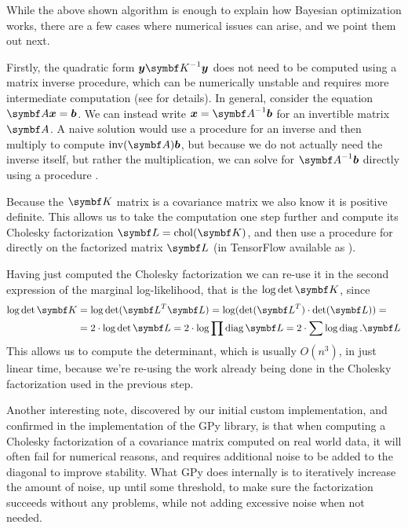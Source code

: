 While the above shown algorithm is enough to explain how Bayesian optimization works, there are a few cases where numerical issues can arise, and we point them out next.

Firstly, the quadratic form $\vy \mK^{-1} \vy$ does not need to be computed using a matrix inverse procedure, which can be numerically unstable and requires more intermediate computation (see \cite{cholesky-inverse-krishnamoorthy2013matrix} for details). In general, consider the equation $\mA \vx = \vb$. We can instead write $\vx = \mA^{-1} \vb$ for an invertible matrix $\mA$. A naive solution would use a procedure for an inverse and then multiply to compute $\inv(\mA) \vb$, but because we do not actually need the inverse itself, but rather the multiplication, we can solve for $\mA^{-1} \vb$ directly using a  procedure \citep{numpy}.

Because the $\mK$ matrix is a covariance matrix we also know it is positive definite. This allows us to take the computation one step further and compute its Cholesky factorization $\mL = \chol(\mK)$, and then use a procedure for  directly on the factorized matrix $\mL$ (in TensorFlow available as ).

Having just computed the Cholesky factorization we can re-use it in the second expression of the marginal log-likelihood, that is the $\log \det \mK$, since
\begin{align}
\log \det \mK &= \log \det(\mL^T \mL) = \log(\det(\mL^T) \cdot \det(\mL)) = \\
&= 2 \cdot \log \det \mL = 2 \cdot \log \prod \diag \mL = 2 \cdot \sum \log \diag. \mL
\end{align}
This allows us to compute the determinant, which is usually $O(n^3)$, in just linear time, because we're re-using the work already being done in the Cholesky factorization used in the previous step.

Another interesting note, discovered by our initial custom implementation, and confirmed in the implementation of the GPy \citep{gpy2014} library, is that when computing a Cholesky factorization of a covariance matrix computed on real world data, it will often fail for numerical reasons, and requires additional noise to be added to the diagonal to improve stability. What GPy does internally is to iteratively increase the amount of noise, up until some threshold, to make sure the factorization succeeds without any problems, while not adding excessive noise when not needed.

